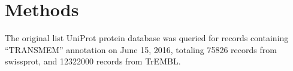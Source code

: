 \section{Methods}
The original list UniProt protein database was queried for records containing ``TRANSMEM'' annotation on June 15, 2016, totaling 75826 records from swissprot, and 12322000 records from TrEMBL.%
